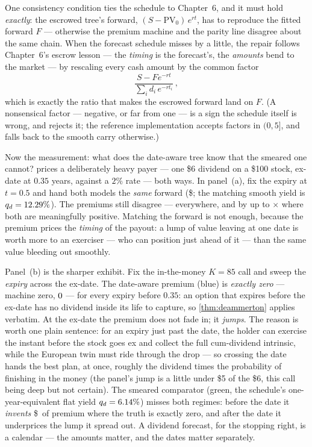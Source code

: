 One consistency condition ties the schedule to Chapter~6, and it must
hold \emph{exactly}: the escrowed tree's forward,
$(S-\mathrm{PV}_0)\,e^{rt}$, has to reproduce the fitted forward $F$
--- otherwise the premium machine and the parity line disagree about
the same chain.  When the forecast schedule misses by a little, the
repair follows Chapter~6's escrow lesson --- the \emph{timing} is the
forecast's, the \emph{amounts} bend to the market --- by rescaling
every cash amount by the common factor
\begin{equation}
\frac{S-F e^{-rt}}{\sum_i d_i\,e^{-r t_i}}\,,
\label{eq:deamalpha}
\end{equation}
which is exactly the ratio that makes the escrowed forward land on
$F$.  (A nonsensical factor --- negative, or far from one --- is a
sign the schedule itself is wrong, and rejects it; the reference
implementation accepts factors in $(0,5]$, and falls back to the
smooth carry otherwise.)

Now the measurement: what does the date-aware tree know that the
smeared one cannot?   prices a deliberately
heavy payer --- one \$6 dividend on a \$100 stock, ex-date at $0.35$
years, against a $2\%$ rate --- both ways.  In panel~(a), fix the
expiry at $t=0.5$ and hand both models the \emph{same} forward
(\$\MacDeamEscrowFwd; the matching smooth yield is
$q_d=12.29\%$).  The premiums still disagree ---
everywhere, and by up to \MacDeamEscrowRatioMax$\times$ where both
are meaningfully positive.  Matching the forward is not enough,
because the premium prices the \emph{timing} of the payout: a lump
of value leaving at one date is worth more to an exerciser --- who
can position just ahead of it --- than the same value bleeding out
smoothly.

Panel~(b) is the sharper exhibit.  Fix the in-the-money $K=85$ call
and sweep the \emph{expiry} across the ex-date.  The date-aware
premium (blue) is \emph{exactly zero} --- machine zero,
$0$ --- for every expiry before $0.35$:
an option that expires before the ex-date has no dividend inside its
life to capture, so \cref{thm:deammerton} applies verbatim.  At the
ex-date the premium does not fade in; it \emph{jumps}.  The reason is
worth one plain sentence: for an expiry just past the date, the
holder can exercise the instant before the stock goes ex and collect
the full cum-dividend intrinsic, while the European twin must ride
through the drop --- so crossing the date hands the best plan, at
once, roughly the dividend times the probability of finishing in the
money (the panel's jump is a little under \$5 of the \$6, this call
being deep but not certain).  The smeared comparator (green, the schedule's
one-year-equivalent flat yield $q_d=6.14\%$)
misses both regimes: before the date it \emph{invents}
\$\MacDeamEscrowFlatPreExMax\ of premium where the truth is exactly
zero, and after the date it underprices the lump it spread out.  A
dividend forecast, for the stopping right, is a calendar --- the
amounts matter, and the dates matter separately.

